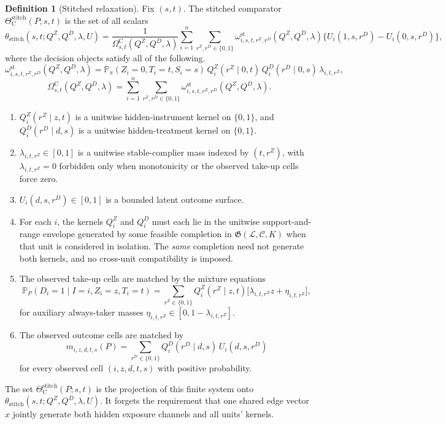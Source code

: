 \documentclass[11pt]{article}
\renewcommand{\Pr}{\mathbb{P}}
\theoremstyle{definition}
\newtheorem{definition}{Definition}
\theoremstyle{plain}
\theoremstyle{remark}
\begin{document}
\begin{definition}[Stitched relaxation]\label{def:stitched}
Fix \((s,t)\). The stitched comparator \(\Theta_{\mathrm{C}}^{\mathrm{stitch}}(P;s,t)\) is the set of all scalars
\[
\theta_{\mathrm{stitch}}(s,t;Q^Z,Q^D,\lambda,U)
=
\frac{1}{\Omega^{\mathrm C}_{s,t}(Q^Z,Q^D,\lambda)}
\sum_{i=1}^n \sum_{r^Z,r^D\in\{0,1\}}
\omega^{\mathrm{st}}_{i,s,t,r^Z,r^D}(Q^Z,Q^D,\lambda)
\{U_i(1,s,r^D)-U_i(0,s,r^D)\},
\]
where the decision objects satisfy all of the following.
\[
\omega^{\mathrm{st}}_{i,s,t,r^Z,r^D}(Q^Z,Q^D,\lambda)
=
\Pr_\pi(Z_i=0,T_i=t,S_i=s)\,
Q_i^Z(r^Z\mid 0,t)\,Q_i^D(r^D\mid 0,s)\,\lambda_{i,t,r^Z},
\]
\[
\Omega^{\mathrm C}_{s,t}(Q^Z,Q^D,\lambda)
=
\sum_{i=1}^n\sum_{r^Z,r^D\in\{0,1\}}
\omega^{\mathrm{st}}_{i,s,t,r^Z,r^D}(Q^Z,Q^D,\lambda).
\]
\begin{enumerate}[leftmargin=*]
\item \(Q_i^Z(r^Z\mid z,t)\) is a unitwise hidden-instrument kernel on \(\{0,1\}\), and \(Q_i^D(r^D\mid d,s)\) is a unitwise hidden-treatment kernel on \(\{0,1\}\).
\item \(\lambda_{i,t,r^Z}\in[0,1]\) is a unitwise stable-complier mass indexed by \((t,r^Z)\), with \(\lambda_{i,t,r^Z}=0\) forbidden only when monotonicity or the observed take-up cells force zero.
\item \(U_i(d,s,r^D)\in[0,1]\) is a bounded latent outcome surface.
\item For each \(i\), the kernels \(Q_i^Z\) and \(Q_i^D\) must each lie in the unitwise support-and-range envelope generated by some feasible completion in \(\mathfrak G(\mathcal L,\mathcal C,K)\) when that unit is considered in isolation. The \emph{same} completion need not generate both kernels, and no cross-unit compatibility is imposed.
\item The observed take-up cells are matched by the mixture equations
\[
\Pr_P(D_i=1\mid I=i,Z_i=z,T_i=t)
=
\sum_{r^Z\in\{0,1\}} Q_i^Z(r^Z\mid z,t)
\bigl[\lambda_{i,t,r^Z} z + \eta_{i,t,r^Z}\bigr],
\]
for auxiliary always-taker masses \(\eta_{i,t,r^Z}\in[0,1-\lambda_{i,t,r^Z}]\).
\item The observed outcome cells are matched by
\[
m_{i,z,d,t,s}(P)
=
\sum_{r^D\in\{0,1\}} Q_i^D(r^D\mid d,s)\, U_i(d,s,r^D)
\]
for every observed cell \((i,z,d,t,s)\) with positive probability.
\end{enumerate}
The set \(\Theta_{\mathrm{C}}^{\mathrm{stitch}}(P;s,t)\) is the projection of this finite system onto \(\theta_{\mathrm{stitch}}(s,t;Q^Z,Q^D,\lambda,U)\). It forgets the requirement that one shared edge vector \(x\) jointly generate both hidden exposure channels and all units' kernels.
\end{definition}
\end{document}
